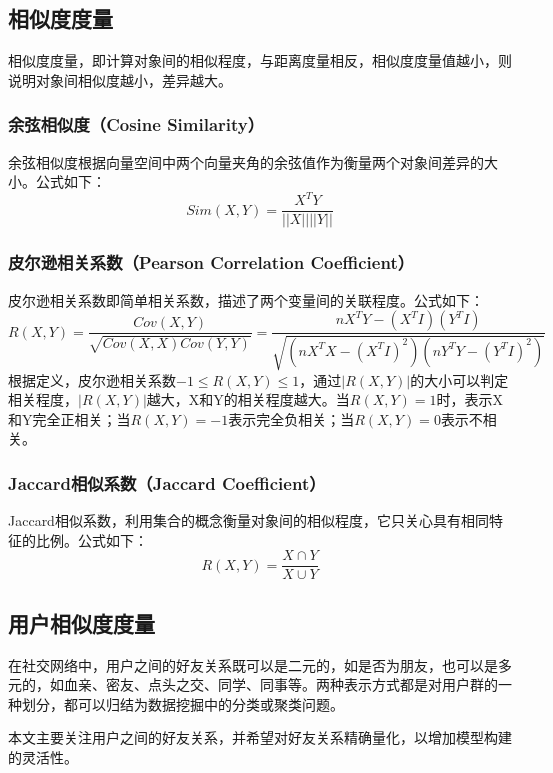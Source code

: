 \subsection{相似度度量}
相似度度量，即计算对象间的相似程度，与距离度量相反，相似度度量值越小，则说明对象间相似度越小，差异越大。

\subsubsection{余弦相似度（Cosine Similarity）}
余弦相似度根据向量空间中两个向量夹角的余弦值作为衡量两个对象间差异的大小。公式如下：
\begin{equation}\label{eq:cosinesim}
Sim(X,Y)=\frac{X^TY}{||X||||Y||}
\end{equation}

\subsubsection{皮尔逊相关系数（Pearson Correlation Coefficient）}
皮尔逊相关系数即简单相关系数，描述了两个变量间的关联程度。公式如下：
\begin{equation}\label{eq:pearsoncor}
R(X,Y)=\frac{Cov(X,Y)}{\sqrt{Cov(X,X)Cov(Y,Y)}}=\frac{nX^TY-(X^TI)(Y^TI)}{\sqrt{(nX^TX-(X^TI)^2)(nY^TY-(Y^TI)^2)}}
\end{equation}
根据定义，皮尔逊相关系数$-1 \le R(X,Y) \le 1$，通过$|R(X,Y)|$的大小可以判定相关程度，$|R(X,Y)|$越大，X和Y的相关程度越大。当$R(X,Y)=1$时，表示X和Y完全正相关；当$R(X,Y)=-1$表示完全负相关；当$R(X,Y)=0$表示不相关。

\subsubsection{Jaccard相似系数（Jaccard Coefficient）}
Jaccard相似系数，利用集合的概念衡量对象间的相似程度，它只关心具有相同特征的比例。公式如下：
\begin{equation}\label{eq:jaccardsim}
R(X,Y)=\frac{X\cap Y}{X\cup Y}
\end{equation}

\subsection{用户相似度度量}
在社交网络中，用户之间的好友关系既可以是二元的，如是否为朋友，也可以是多元的，如血亲、密友、点头之交、同学、同事等。两种表示方式都是对用户群的一种划分，都可以归结为数据挖掘中的分类或聚类问题。

本文主要关注用户之间的好友关系，并希望对好友关系精确量化，以增加模型构建的灵活性。

